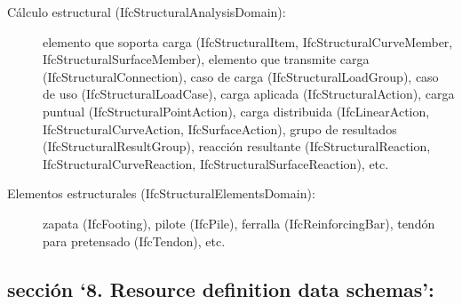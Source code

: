 \documentclass[spanish,12pt,a4paper,final,oneside]{book}
\begin{document}
\begin{description}
\item[Cálculo estructural (IfcStructuralAnalysisDomain):] elemento que soporta carga (IfcStructuralItem, IfcStructuralCurveMember, IfcStructuralSurfaceMember), elemento que transmite carga (IfcStructuralConnection), caso de carga (IfcStructuralLoadGroup), caso de uso (IfcStructuralLoadCase), carga aplicada (IfcStructuralAction), carga puntual (IfcStructuralPointAction), carga distribuida (IfcLinearAction, IfcStructuralCurveAction, IfcSurfaceAction), grupo de resultados (IfcStructuralResultGroup), reacción resultante (IfcStructuralReaction, IfcStructuralCurveReaction, IfcStructuralSurfaceReaction), etc.

\item[Elementos estructurales (IfcStructuralElementsDomain):] zapata (IfcFooting), pilote (IfcPile), ferralla (IfcReinforcingBar), tendón para pretensado (IfcTendon), etc. 
\end{description}
 
\subsection{sección `8. Resource definition data schemas':}
\end{document}
